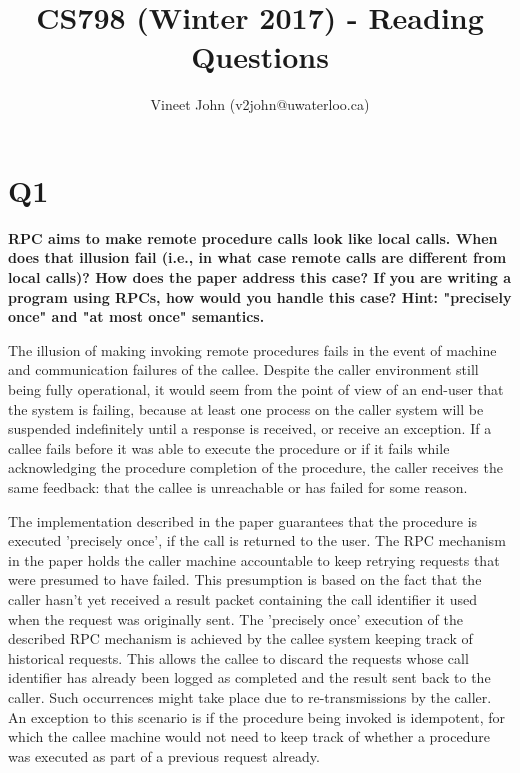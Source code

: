 \documentclass[a4paper]{article}
\begin{document}
\title{CS798 (Winter 2017) - Reading Questions}
\author{Vineet John (v2john@uwaterloo.ca)}
\date{}        
\maketitle

\section{Q1} %
\label{sec:q1}
    
    \textbf{RPC aims to make remote procedure calls look like local calls. When does that illusion fail (i.e., in what case remote calls are different from local calls)? How does the paper address this case? If you are writing a program using RPCs, how would you handle this case? Hint: "precisely once" and "at most once" semantics.}

    The illusion of making invoking remote procedures fails in the event of machine and communication failures of the callee. Despite the caller environment still being fully operational, it would seem from the point of view of an end-user that the system is failing, because at least one process on the caller system will be suspended indefinitely until a response is received, or receive an exception. If a callee fails before it was able to execute the procedure or if it fails while acknowledging the procedure completion of the procedure, the caller receives the same feedback: that the callee is unreachable or has failed for some reason.

    The implementation described in the paper guarantees that the procedure is executed 'precisely once', if the call is returned to the user. The RPC mechanism in the paper holds the caller machine accountable to keep retrying requests that were presumed to have failed. This presumption is based on the fact that the caller hasn't yet received a result packet containing the call identifier it used when the request was originally sent. The 'precisely once' execution of the described RPC mechanism is achieved by the callee system keeping track of historical requests. This allows the callee to discard the requests whose call identifier has already been logged as completed and the result sent back to the caller. Such occurrences might take place due to re-transmissions by the caller. An exception to this scenario is if the procedure being invoked is idempotent, for which the callee machine would not need to keep track of whether a procedure was executed as part of a previous request already.
\end{document}
